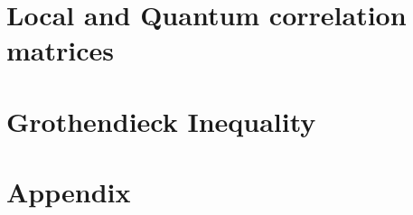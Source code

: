 \section{Local and Quantum correlation matrices} %
	\vspace{8pt}

	

\section{Grothendieck Inequality} %
	

\section*{Appendix}\label{Appendix}
		



	
